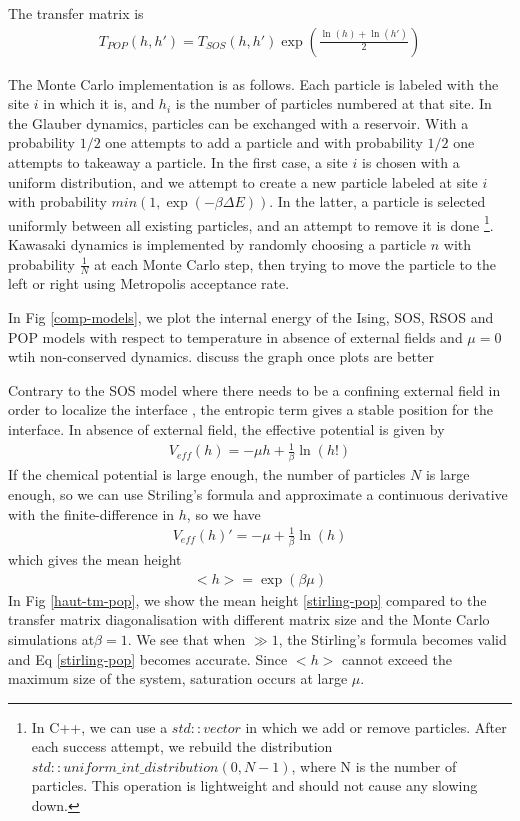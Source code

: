 The transfer matrix is
\begin{align}
T_{POP}(h,h') = T_{SOS}(h,h') \exp \left( \frac{\ln(h)+\ln(h')}{2} \right)
\end{align}

The Monte Carlo implementation is as follows. Each particle is labeled with the site $i$ in which it is, and $h_i$ is the number of particles numbered at that site. 
In the Glauber dynamics, particles can be exchanged with a reservoir. With a probability $1/2$ one attempts to add a particle and with probability $1/2$ one attempts to takeaway a particle. In the first case, a site $i$ is chosen with a uniform distribution, and we attempt to create a new particle labeled at site $i$ with probability $min(1,\exp(-\beta \Delta E))$. In the latter, a particle is selected uniformly between all existing particles, and an attempt to remove it is done
\footnote{In C++, we can use a $std::vector$ in which we add or remove particles. After each success attempt, we rebuild the distribution $std::uniform\_int\_distribution(0,N-1)$, where N is the number of particles. This operation is lightweight and should not cause any slowing down.}.
Kawasaki dynamics is implemented by randomly choosing a particle $n$ with probability $\frac{1}{N}$ at each Monte Carlo step, then trying to move the particle to the left or right using Metropolis acceptance rate. 

In Fig \ref{comp-models}, we plot the internal energy of the Ising, SOS, RSOS and POP models with respect to temperature in absence of external fields and $\mu=0$ wtih non-conserved dynamics. {\color{red} discuss the graph once plots are better}

Contrary to the SOS model where there needs to be a confining external field in order to localize the interface \cite{burkhardt_localisation-delocalisation_1981,chui_pinning_1981}, the entropic term gives a stable position for the interface. In absence of external field, the effective potential is given by
\begin{align} 
    V_{eff}(h) = - \mu h + \frac{1}{\beta}\ln(h!)
\end{align}
If the chemical potential is large enough, the number of particles $N$ is large enough, so we can use Striling's formula and approximate a continuous derivative with the finite-difference in $h$, so we have
\begin{align} 
    V_{eff}(h)' = - \mu +\frac{1}{\beta} \ln(h)
\end{align}which gives the mean height 
\begin{align} 
    <h> = \exp(\beta \mu) 
\label{stirling-pop}
    \end{align}
    In Fig \ref{haut-tm-pop}, we show the mean height \eqref{stirling-pop} compared to the transfer matrix diagonalisation with different matrix size and the Monte Carlo simulations at$\beta=1$. We see that when $ \gg 1$, the Stirling's formula becomes valid and Eq \eqref{stirling-pop} becomes accurate. Since $<h>$ cannot exceed the maximum size of the system, saturation occurs at large $\mu$. 



